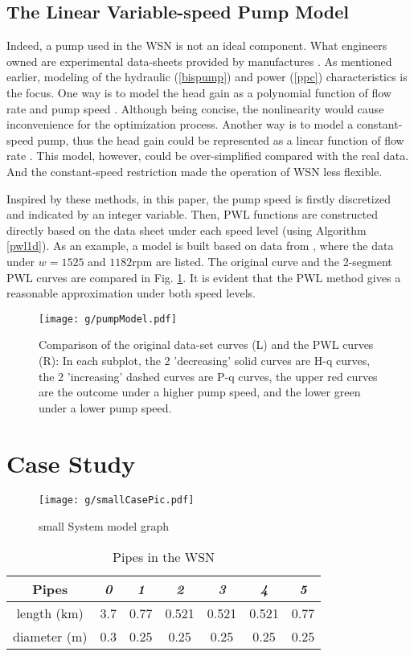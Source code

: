 \documentclass[journal,twoside,web]{ieeecolor}
\begin{document}
\subsection{The Linear Variable-speed Pump Model}\label{mypmsec}
Indeed, a pump used in the WSN is not an ideal component.
What engineers owned are experimental data-sheets provided by manufactures \cite{pumpModel}.
As mentioned earlier, modeling of the hydraulic (\ref{bispump}) and power (\ref{ppc}) characteristics is the focus.
One way is to model the head gain as a polynomial function of flow rate and pump speed \cite{waterNet}.
Although being concise, the nonlinearity would cause inconvenience for the optimization process.
Another way is to model a constant-speed pump, thus the head gain could be represented as a linear function of flow rate \cite{linpump}.
This model, however, could be over-simplified compared with the real data.
And the constant-speed restriction made the operation of WSN less flexible.

Inspired by these methods, in this paper, the pump speed is firstly discretized and indicated by an integer variable.
Then, PWL functions are constructed directly based on the data sheet under each speed level (using Algorithm \ref{pwl1d}).
As an example, a model is built based on data from \cite{pumpModel}, where the data under $w=1525$ and $1182$rpm are listed.
The original curve and the 2-segment PWL curves are compared in Fig. \ref{pump2model}.
It is evident that the PWL method gives a reasonable approximation under both speed levels.
\begin{figure}[htbp]
    \centering
    \texttt{[image: g/pumpModel.pdf]}
    \caption{Comparison of the original data-set curves (L) and the PWL curves (R): In each subplot, the 2 'decreasing' solid curves are H-q curves, the 2 'increasing' dashed curves are P-q curves, the upper red curves are the outcome under a higher pump speed, and the lower green under a lower pump speed.}
    \label{pump2model}
\end{figure}

\section{Case Study}
\begin{figure}[htbp]
    \centering
    \texttt{[image: g/smallCasePic.pdf]}
    \caption{small System model graph}
    \label{smallsysgraph}
\end{figure}

\begin{table}[htbp]
\caption{Pipes in the WSN}\label{wNettable}
\centering
\begin{tabular}{c|cccccc}
\hline
Pipes & \textit{0} & \textit{1} & \textit{2} & \textit{3} & \textit{4} & \textit{5} \\
\hline
length (km) &3.7 & 0.77 & 0.521 & 0.521 & 0.521 & 0.77 \\
diameter (m) & 0.3 & 0.25 & 0.25  & 0.25  & 0.25  & 0.25 \\
\hline
\end{tabular}
\end{table}
\end{document}
